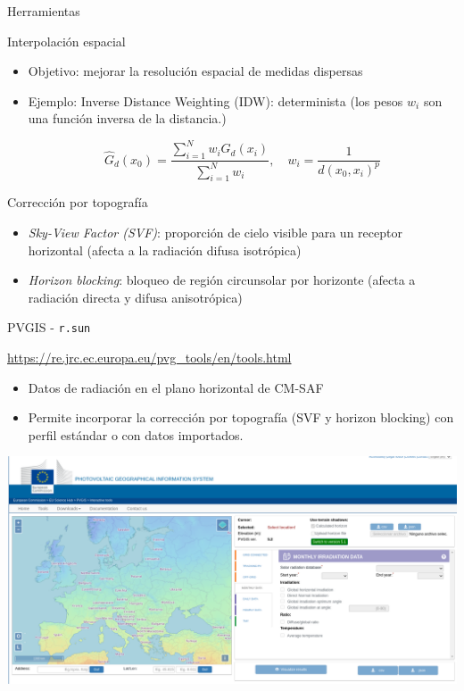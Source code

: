 \documentclass[aspectratio=169, usenames,svgnames,dvipsnames]{beamer}
\begin{document}
\begin{frame}[label={sec:orgf9900cf}]{Herramientas}
\begin{block}{Interpolación espacial}
\begin{itemize}
\item \alert{Objetivo}: mejorar la resolución espacial de medidas dispersas

\item Ejemplo: \alert{Inverse Distance Weighting (IDW)}: determinista (los pesos \(w_i\) son una función inversa de la distancia.)

\[
\widehat{G}_d(x_0) = \frac{\sum_{i=1}^N w_i G_{d}(x_i)}{\sum_{i=1}^N w_i}, \quad w_i=\frac  {1}{d(x_0, x_i)^p}
\]
\end{itemize}
\end{block}
\begin{block}{Corrección por topografía}
\begin{itemize}
\item \emph{Sky-View Factor (SVF)}: proporción de cielo visible para un receptor horizontal (afecta a la radiación difusa isotrópica)

\item \emph{Horizon blocking}: bloqueo de región circunsolar por horizonte (afecta a radiación directa y difusa anisotrópica)
\end{itemize}
\end{block}
\end{frame}
\begin{frame}[label={sec:orgc23d65e},fragile]{PVGIS - \texttt{r.sun}}
 \begin{block}{\url{https://re.jrc.ec.europa.eu/pvg\_tools/en/tools.html}}
\begin{itemize}
\item Datos de radiación en el plano horizontal de CM-SAF
\item Permite incorporar la corrección por topografía (SVF y horizon blocking) con perfil estándar o con datos importados.
\end{itemize}

\begin{center}
\includegraphics[height=0.35\textwidth]{../figs/pvgis.png}
\end{center}
\end{block}
\end{frame}
\end{document}
